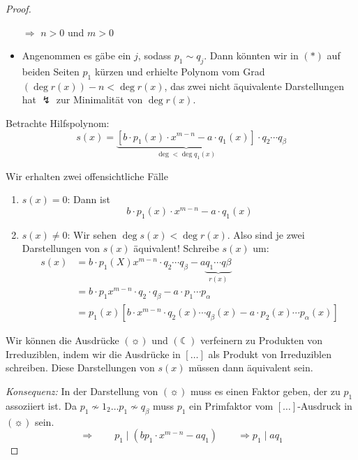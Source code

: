 \documentclass[a4paper,12pt,numbers=noenddot,parskip=full]{scrartcl}
\theoremstyle{dotless}
\theoremstyle{remark}
\begin{document}
\begin{proof}
\begin{itemize}
			$\Rightarrow$ $n > 0$ und $m > 0$
			
			\item Angenommen es gäbe ein $j$, sodass $p_1 \sim q_j$. Dann könnten wir in $(*)$ auf beiden Seiten $p_1$ kürzen und erhielte Polynom vom Grad $(\deg r(x)) - n < \deg r(x)$, das zwei nicht äquivalente Darstellungen hat $\lightning$ zur Minimalität von $\deg r(x)$.
		\end{itemize}
	
		Betrachte Hilfspolynom:
		\begin{equation*}
			s(x) = \underbrace{\left[ b \cdot p_1(x) \cdot x^{m-n} - a \cdot q_1(x) \right]}_{\deg < \deg q_1(x)} \cdot q_2 \cdots q_\beta \tag{\sun}
		\end{equation*}
		
		Wir erhalten zwei offensichtliche Fälle
		\begin{enumerate}
			\item $s(x) = 0$: Dann ist
			\begin{equation*}
				b \cdot p_1(x) \cdot x^{m-n} - a \cdot q_1(x)
			\end{equation*}
			\item $s(x) \neq 0$: Wir sehen $\deg s(x) < \deg r(x)$. Also sind je zwei Darstellungen von $s(x)$ äquivalent! Schreibe $s(x)$ um:
			\begin{align*}
				s(x) &= b \cdot p_1(X) x^{m-n} \cdot q_2 \cdots q_\beta - a \underbrace{q_1 \cdots q\beta}_{r(x)} \\
				&= b \cdot p_1 x ^{m-n} \cdot q_2 \cdot q_\beta - a \cdot p_1 \cdots p_\alpha \\
				&= p_1(x) \left[ b \cdot x^{m-n} \cdot q_2(x) \cdots q_\beta(x) - a \cdot p_2(x) \cdots p_\alpha(x) \right] \tag{\leftmoon}
			\end{align*}
		\end{enumerate}
	
		Wir können die Ausdrücke $(\sun)$ und $(\leftmoon)$ verfeinern zu Produkten von Irreduziblen, indem wir die Ausdrücke in $[\dots]$ als Produkt von Irreduziblen schreiben. Diese Darstellungen von $s(x)$ müssen dann äquivalent sein.
		
		\textit{Konsequenz:} In der Darstellung von $(\sun)$ muss es einen Faktor geben, der zu $p_1$ assoziiert ist. Da $p_1 \nsim 1_2 \dots p_1 \nsim q_\beta$ muss $p_1$ ein Primfaktor vom $[\dots]$-Ausdruck in $(\sun)$ sein.
		\begin{equation*}
			\Rightarrow \qquad p_1 \mid (b p_1 \cdot x^{m-n} - a q_1) \qquad \Rightarrow p_1 \mid a q_1
		\end{equation*}
		

\end{proof}
\end{document}
